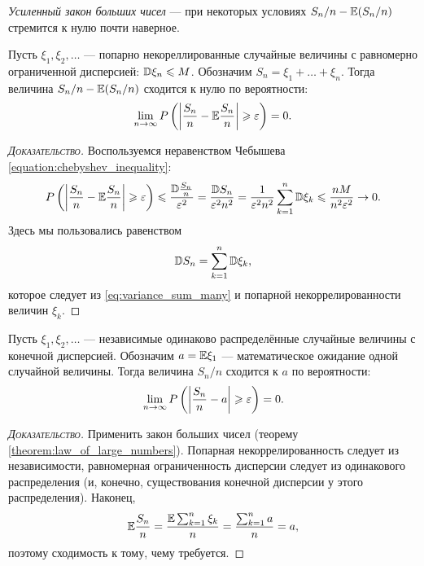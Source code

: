 \documentclass[../main.tex]{subfiles}
\begin{document}
\textit{Усиленный закон больших чисел} --- при некоторых условиях $ S_n/n-\mathbb E (S_n/n) $ стремится к нулю почти наверное.
\pagebreak
\begin{thm}
 \label{theorem:law_of_large_numbers}
 Пусть $ \xi_1, \xi_2, \ldots $ --- попарно некореллированные случайные величины с равномерно ограниченной дисперсией: $ \mathbb D \xi_n \leqslant M $. Обозначим $ S_n = \xi_1 + \ldots + \xi_n $. Тогда величина $ S_n/n-\mathbb E (S_n/n) $  сходится к нулю по вероятности:
 \begin{align*}
  \lim_{n \to \infty} P\left(\left| \frac{S_n}{n} - \mathbb E \frac{S_n}{n} \right| \geqslant \varepsilon\right) = 0.
 \end{align*}
\end{thm}
\begin{proof}[\normalfont\textsc{Доказательство}]
 Воспользуемся неравенством Чебышева \eqref{equation:chebyshev_inequality}:
 \begin{align*}
  P \left( \left| \frac{S_n}{n} - \mathbb E \frac{S_n}{n} \right| \geqslant \varepsilon \right) \leqslant \frac{\mathbb D \frac{S_n}{n}}{\varepsilon ^{ 2}} = \frac{\mathbb D S_n}{\varepsilon^{2} n^{2}} = \frac{1}{\varepsilon^{2} n^{2}} \sum_{k=1}^{n}\mathbb D\xi_k \leqslant \frac{nM}{n^{2}\varepsilon^{2}} \to 0.
 \end{align*} Здесь мы пользовались равенством
 \begin{align*}
  \mathbb D S_n = \sum_{k=1}^{n}\mathbb D\xi_k,
 \end{align*} которое следует из \eqref{eq:variance_sum_many} и попарной некоррелированности величин $ \xi_k $.
\end{proof}

\begin{crly}
 \label{corallry:law_of_large_numbers_chebyshev}
 Пусть $ \xi_1, \xi_2, \ldots $  --- независимые одинаково распределённые случайные величины с конечной дисперсией. Обозначим $ a = \mathbb E \xi_1 $ --- математическое ожидание одной случайной величины. Тогда величина $ S_n/n $ сходится к $ a $ по вероятности:
 \begin{align*}
  \lim_{n \to \infty} P \left( \left| \frac{S_n}{n}-a \right|\geqslant\varepsilon \right)=0.
 \end{align*}
\end{crly}
\begin{proof}[\normalfont\textsc{Доказательство}]
 Применить закон больших чисел (теорему \ref{theorem:law_of_large_numbers}). Попарная некоррелированность следует из независимости, равномерная ограниченность дисперсии следует из одинакового распределения (и, конечно, существования конечной дисперсии у этого распределения). Наконец,
 \begin{align*}
  \mathbb E \frac{S_n}{n} = \frac{\mathbb E \sum_{k=1}^{n}\xi_k}{n} = \frac{\sum_{k=1}^{n}a}{n} = a,
 \end{align*} поэтому сходимость к тому, чему требуется.
\end{proof}
\end{document}

